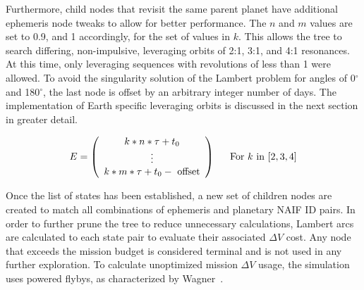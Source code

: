 \documentclass[letterpaper, paper,11pt]{AAS}	%
\begin{document}
Furthermore, child nodes that revisit the same parent planet have additional ephemeris node tweaks to allow for better performance. The $n$ and $m$ values are set to 0.9, and 1 accordingly, for the set of values in $k$. This allows the tree to search differing, non-impulsive, leveraging orbits of 2:1, 3:1, and 4:1 resonances. At this time, only leveraging sequences with revolutions of less than 1 were allowed. To avoid the singularity solution of the Lambert problem for angles of 0$^\circ$ and 180$^\circ$, the last node is offset by an arbitrary integer number of days. The implementation of Earth specific leveraging orbits is discussed in the next section in greater detail.

\begin{equation*}
    \label{eq:ephemArrayLev}
    E =
    \left(\begin{array}{c}
        k*n*\tau + t_0 \\
        \vdots \\
        k*m*\tau + t_0 - \text{ offset} \\
    \end{array}\right)\hspace{1.5em}
    \text{For } k \text{ in } [2, 3, 4]
\end{equation*}

Once the list of states has been established, a new set of children nodes are created to match all combinations of ephemeris and planetary NAIF ID pairs. In order to further prune the tree to reduce unnecessary calculations, Lambert arcs are calculated to each state pair to evaluate their associated $\Delta V$ cost. Any node that exceeds the mission budget is considered terminal and is not used in any further exploration. To calculate unoptimized mission $\Delta V$ usage, the simulation uses powered flybys, as characterized by Wagner~\cite{Wagner2015}.
\end{document}
